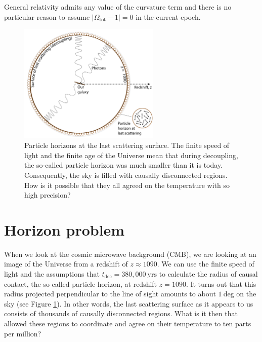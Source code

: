 \documentclass[a4paper,12pt]{article}
\theoremstyle{remark}
\newcommand{\mrm}[1]{\mathrm{#1}}
\renewcommand{\=}[1]{\stackrel{#1}{=}} %
\theoremstyle{plain}
\theoremstyle{definition}
\begin{document}
General relativity admits any value of the curvature term and there is no particular reason to assume $|\Omega _\mrm{tot} - 1| = 0$ in the current epoch.

\begin{figure}[t]
\begin{center}
    \includegraphics*[angle=0,width=0.6\textwidth]{img/particle_horizon.png}
    \caption[Particle horizons.]{Particle horizons at the last scattering surface. The finite speed of light and the finite age of the Universe mean that during decoupling, the so-called particle horizon was much smaller than it is today. Consequently, the sky is filled with causally disconnected regions. How is it possible that they all agreed on the temperature with so high precision?}
\label{fig:particle_horizons}
\end{center}
\end{figure}

\section{Horizon problem}

When we look at the cosmic microwave background (CMB), we are looking at an image of the Universe from a redshift of $z \approx 1090$. We can use the finite speed of light and the assumptions that $t_\mrm{dec} = 380,000 \:\mrm{yrs}$ to calculate the radius of causal contact, the so-called particle horizon, at redshift $z=1090$. It turns out that this radius projected perpendicular to the line of sight amounts to about $1 \:\mrm{deg}$ on the sky (see Figure \ref{fig:particle_horizons}). In other words, the last scattering surface as it appears to us consists of thousands of causally disconnected regions. What is it then that allowed these regions to coordinate and agree on their temperature to ten parts per million?
\end{document}
